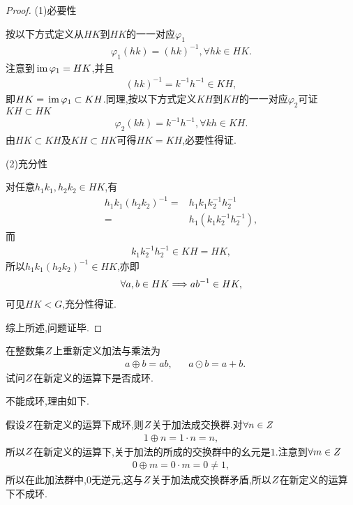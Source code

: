 \begin{proof}
    (1)必要性

    按以下方式定义从$HK$到$HK$的一一对应$\varphi_1$\begin{align*}
        \varphi_1(hk)=(hk)^{-1},\forall hk\in HK.
    \end{align*}注意到$\,\mathrm{im}\,\varphi_1=HK$,并且\begin{align*}
        (hk)^{-1}=k^{-1}h^{-1}\in KH,
    \end{align*}即$HK=\,\mathrm{im}\,\varphi_1\subset KH$.同理,按以下方式定义$KH$到$KH$的一一对应$\varphi_2$可证$KH\subset HK$\begin{align*}
        \varphi_2(kh)=k^{-1}h^{-1},\forall kh\in KH.
    \end{align*}由$HK\subset KH$及$KH\subset HK$可得$HK=KH$,必要性得证.

    (2)充分性

    对任意$h_1k_1,h_2k_2\in HK$,有\begin{align*}
        h_1k_1(h_2k_2)^{-1}=&h_1k_1k_2^{-1}h_2^{-1}\\
        =&h_1(k_1k_2^{-1}h_2^{-1}),
    \end{align*}而\begin{align*}
        k_1k_2^{-1}h_2^{-1}\in KH=HK,
    \end{align*}所以$h_1k_1(h_2k_2)^{-1}\in HK$,亦即\begin{align*}
        \forall a,b\in HK\Longrightarrow ab^{-1}\in HK,
    \end{align*}可见$HK<G$,充分性得证.

    综上所述,问题证毕.
\end{proof}
\begin{problem}[P56T28]
    在整数集$\relax{Z}$上重新定义加法与乘法为\begin{align*}
        &a\oplus b=ab,&&a\odot b=a+b.
    \end{align*}试问$\relax{Z}$在新定义的运算下是否成环.
\end{problem}
\begin{solution}
    不能成环,理由如下.

    假设$\relax{Z}$在新定义的运算下成环,则$\relax{Z}$关于加法成交换群.对$\forall n\in\relax{Z}$
    \begin{align*}
        1\oplus n=1\cdot n=n,
    \end{align*}所以$\relax{Z}$在新定义的运算下,关于加法的所成的交换群中的幺元是$1$.注意到$\forall m\in\relax{Z}$\begin{align*}
        0\oplus m=0\cdot m=0\neq1,
    \end{align*}所以在此加法群中,$0$无逆元,这与$\relax{Z}$关于加法成交换群矛盾,所以$\relax{Z}$在新定义的运算下不成环.
\end{solution}
